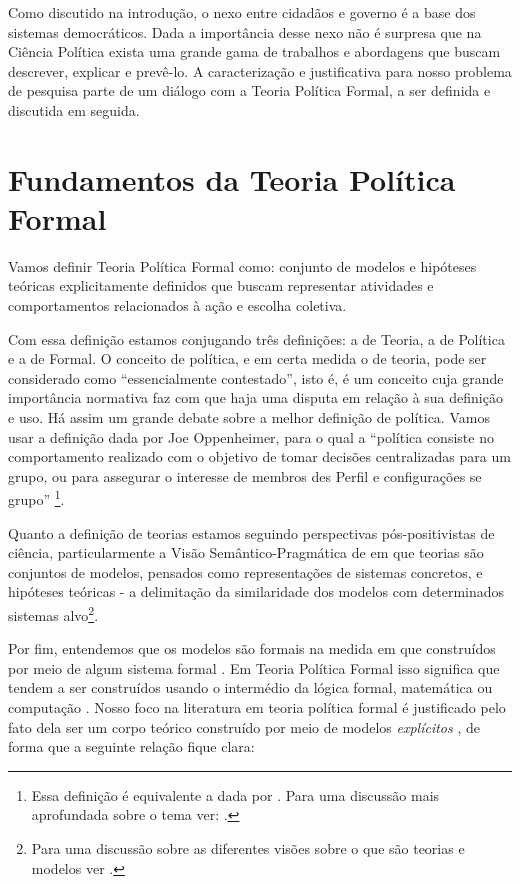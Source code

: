 Como discutido na introdução, o nexo entre cidadãos e governo é a base dos
sistemas democráticos. Dada a importância desse nexo não é surpresa que na
Ciência Política exista uma grande gama de trabalhos e abordagens que buscam
descrever, explicar e prevê-lo. A caracterização e justificativa para nosso
problema de pesquisa parte de um diálogo com a Teoria Política Formal, a ser
definida e discutida em seguida.

\section{Fundamentos da Teoria Política Formal}

Vamos definir Teoria Política Formal como: conjunto de modelos e hipóteses
teóricas explicitamente definidos que buscam representar atividades e
comportamentos relacionados à ação e escolha coletiva.

Com essa definição estamos conjugando três definições: a de Teoria, a de
Política e a de Formal. O conceito de política, e em certa medida o de teoria,
pode ser considerado como ``essencialmente contestado'', isto é, é um conceito
cuja grande importância normativa faz com que haja uma disputa em relação à sua
definição e uso\cite{collier2006essentially}. Há assim um grande debate
sobre a melhor definição de  política. Vamos usar a definição
dada por Joe Oppenheimer, para o qual  a ``política consiste
no comportamento realizado com o objetivo de tomar decisões centralizadas para
um grupo, ou para assegurar o interesse de membros des
Perfil e configurações
se grupo'' \cite[p.
I]{oppenheimer2012principles}\footnote{Essa definição é equivalente a dada por
  . Para uma discussão mais aprofundada sobre o
  tema ver: .}.

Quanto a definição de teorias estamos seguindo perspectivas pós-positivistas de
ciência, particularmente a Visão Semântico-Pragmática de
 em que teorias são conjuntos de modelos, pensados
como representações de sistemas concretos, e hipóteses teóricas - a delimitação
da similaridade dos modelos com determinados sistemas alvo\footnote{Para uma
  discussão sobre as diferentes visões sobre o que são teorias e modelos ver
  .}.

Por fim, entendemos que os modelos são formais na medida em que construídos por
meio de algum sistema formal \cite{wong2015formal}. Em Teoria Política Formal
isso significa que tendem a ser construídos usando o intermédio da lógica formal,
matemática ou computação \cite{morton1999methods}. Nosso foco na literatura em
teoria política formal é justificado pelo fato dela ser um corpo teórico
construído por meio de modelos \textit{explícitos} \cite{epstein2008model}, de
forma que a seguinte relação fique clara:

